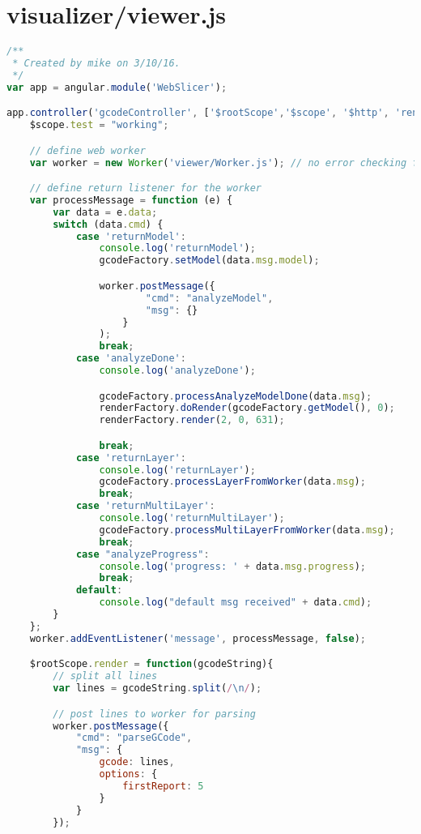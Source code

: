 \section{visualizer/viewer.js}
\begin{lstlisting}[language=JavaScript, label={lst:viewer}, caption=This file takes in all requests for parsing gcode and for canvas frames to the main page.]
/**
 * Created by mike on 3/10/16.
 */
var app = angular.module('WebSlicer');

app.controller('gcodeController', ['$rootScope','$scope', '$http', 'renderFactory', 'gcodeFactory', function ($rootScope ,$scope, $http, renderFactory, gcodeFactory) {
    $scope.test = "working";

    // define web worker
    var worker = new Worker('viewer/Worker.js'); // no error checking for this

    // define return listener for the worker
    var processMessage = function (e) {
        var data = e.data;
        switch (data.cmd) {
            case 'returnModel':
                console.log('returnModel');
                gcodeFactory.setModel(data.msg.model);

                worker.postMessage({
                        "cmd": "analyzeModel",
                        "msg": {}
                    }
                );
                break;
            case 'analyzeDone':
                console.log('analyzeDone');

                gcodeFactory.processAnalyzeModelDone(data.msg);
                renderFactory.doRender(gcodeFactory.getModel(), 0);
                renderFactory.render(2, 0, 631);

                break;
            case 'returnLayer':
                console.log('returnLayer');
                gcodeFactory.processLayerFromWorker(data.msg);
                break;
            case 'returnMultiLayer':
                console.log('returnMultiLayer');
                gcodeFactory.processMultiLayerFromWorker(data.msg);
                break;
            case "analyzeProgress":
                console.log('progress: ' + data.msg.progress);
                break;
            default:
                console.log("default msg received" + data.cmd);
        }
    };
    worker.addEventListener('message', processMessage, false);

    $rootScope.render = function(gcodeString){
        // split all lines
        var lines = gcodeString.split(/\n/);

        // post lines to worker for parsing
        worker.postMessage({
            "cmd": "parseGCode",
            "msg": {
                gcode: lines,
                options: {
                    firstReport: 5
                }
            }
        });


\end{lstlisting}
